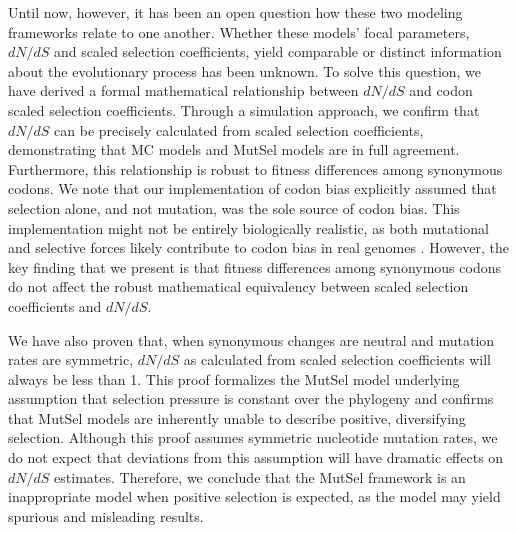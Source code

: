 \documentclass{pnastwo}
\begin{document}
\begin{article}
Until now, however, it has been an open question how these two modeling frameworks relate to one another. Whether these models' focal parameters, $dN/dS$ and scaled selection coefficients, yield comparable or distinct information about the evolutionary process has been unknown. To solve this question, we have derived a formal mathematical relationship between $dN/dS$ and codon scaled selection coefficients. Through a simulation approach, we confirm that $dN/dS$ can be precisely calculated from scaled selection coefficients, demonstrating that MC models and MutSel models are in full agreement. Furthermore, this relationship is robust to fitness differences among synonymous codons. We note that our implementation of codon bias explicitly assumed that selection alone, and not mutation, was the sole source of codon bias. This implementation might not be entirely biologically realistic, as both mutational and selective forces likely contribute to codon bias in real genomes \cite{Blumer1991, Duret2002, HershbergPetrov2008, Chen2009, PlotkinKudla2010}. However, the key finding that we present is that fitness differences among synonymous codons do not affect the robust mathematical equivalency between scaled selection coefficients and $dN/dS$. 
		
We have also proven that, when synonymous changes are neutral and mutation rates are symmetric, $dN/dS$ as calculated from scaled selection coefficients will always be less than 1. This proof formalizes the MutSel model underlying assumption that selection pressure is constant over the phylogeny and confirms that MutSel models are inherently unable to describe positive, diversifying selection. Although this proof assumes symmetric nucleotide mutation rates, we do not expect that deviations from this assumption will have dramatic effects on $dN/dS$ estimates. Therefore, we conclude that the MutSel framework is an inappropriate model when positive selection is expected, as the model may yield spurious and misleading results. 
		

\end{article}
\end{document}
